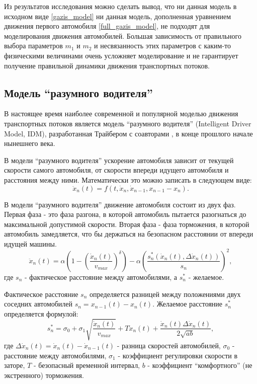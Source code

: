 \documentclass[12pt, a4paper]{extarticle}
\numberwithin{equation}{section}
\begin{document}
Из результатов исследования можно сделать вывод, что ни данная модель в исходном виде \eqref{gazis_model} ни данная модель, дополненная уравнением движения первого автомобиля \eqref{full_gazis_model}, не подходят для моделирования движения автомобилей. Большая зависимость от правильного выбора параметров $m_1$ и $m_2$ и несвязанность этих параметров с каким-то физическими величинами очень усложняет моделирование и не гарантирует получение правильной динамики движения транспортных потоков. 

\subsection{Модель ``разумного водителя''}
В настоящее время наиболее современной и популярной моделью движения транспортных потоков является модель ``разумного водителя'' (Intelligent Driver Model, IDM), разработанная Трайбером с соавторами \cite{TreiberModel_1}, \cite{TreiberModel_2} в конце прошлого начале нынешнего века. 

В модели ``разумного водителя'' ускорение автомобиля зависит от текущей скорости самого автомобиля, от скорости впереди идущего автомобиля и расстояния между ними. Математически это можно записать в следующем виде:
\begin{equation*}
\ddot{x}_n(t)=f(t, \dot{x}_n,\dot{x}_{n-1}, x_{n-1}-x_n).
\end{equation*} 

В модели ``разумного водителя'' движение автомобиля состоит из двух фаз. Первая фаза - это фаза разгона, в которой автомобиль пытается разогнаться до максимальной допустимой скорости. Вторая фаза - фаза торможения, в которой автомобиль замедляется, что бы держаться на безопасном расстоянии от впереди идущей машины.
\begin{equation} \label{treiber_model}
\ddot{x}_n(t)= \alpha\left( 1-\left( \dfrac{\dot{x}_n(t)}{v_{max}}\right)^\delta \right) - \alpha\left( \dfrac{s^*_n(\dot{x}_n(t),\Delta \dot{x}_n(t))}{s_n}\right)^2,
\end{equation}
где $s_n$ - фактическое расстояние между автомобилями, а $s^*_n$ - желаемое.

Фактическое расстояние $s_n$ определяется разницей между положениями двух соседних автомобилей $s_n=x_{n-1}(t)-x_n(t)$. Желаемое расстояние  $s^*_n$ определяется формулой:
\begin{equation*}
s^*_n = \sigma_0+\sigma_1\sqrt{\dfrac{ \dot{x}_n(t)}{v_{max}}} +T \dot{x}_n(t)+ \dfrac{ \dot{x}_n(t)\Delta \dot{x}_n(t) }{2\sqrt{ab}},
\end{equation*}
где $\Delta \dot{x}_n(t) = \dot{x}_n(t)- \dot{x}_{n-1}(t)$ - разница скоростей автомобилей, $\sigma_0$ - расстояние между автомобилями, $\sigma_1$ - коэффициент регулировки скорости в заторе, $T$ - безопасный временной интервал, $b$ - коэффициент ``комфортного'' (не экстренного) торможения.
\end{document}
